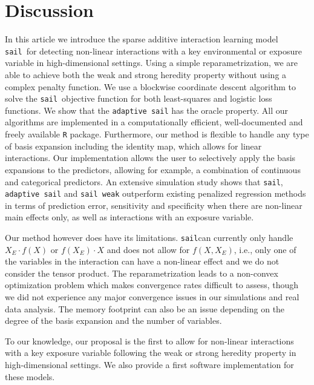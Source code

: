 \documentclass[12pt,letter]{article}\usepackage[]{graphicx}\usepackage[]{color}
\newcommand{\sail}{\texttt{sail}}
\begin{document}
\section{Discussion}

In this article we introduce the sparse additive interaction learning model \sail ~for detecting non-linear interactions with a key environmental or exposure variable in high-dimensional settings. 
Using a simple reparametrization, we are able to achieve both the weak and strong heredity property without using a complex penalty function. We use a blockwise coordinate descent algorithm to solve the \sail ~objective function for both least-squares and logistic loss functions. 
We show that the \texttt{adaptive sail} has the oracle property. All our algorithms are implemented in a computationally efficient, well-documented and freely available \texttt{R} package. 
Furthermore, our method is flexible to handle any type of basis expansion including the identity map, which allows for linear interactions. Our implementation allows the user to selectively apply the basis expansions to the predictors, allowing for example, a combination of continuous and categorical predictors. 
An extensive simulation study shows that \sail, \texttt{adaptive sail} and \texttt{sail weak} outperform existing penalized regression methods in terms of prediction error, sensitivity and specificity when there are non-linear main effects only, as well as interactions with an exposure variable. 

Our method however does have its limitations. \sail can currently only handle $X_E \cdot f(X)$ or $f(X_E) \cdot X$ and does not allow for $f(X, X_E)$, i.e., only one of the variables in the interaction can have a non-linear effect and we do not consider the tensor product. The reparametrization leads to a non-convex optimization problem which makes convergence rates difficult to assess, though we did not experience any major convergence issues in our simulations and real data analysis. The memory footprint can also be an issue depending on the degree of the basis expansion and the number of variables. 

To our knowledge, our proposal is the first to allow for non-linear interactions with a key exposure variable following the weak or strong heredity property in high-dimensional settings. We also provide a first software implementation for these models. 






\end{document}
